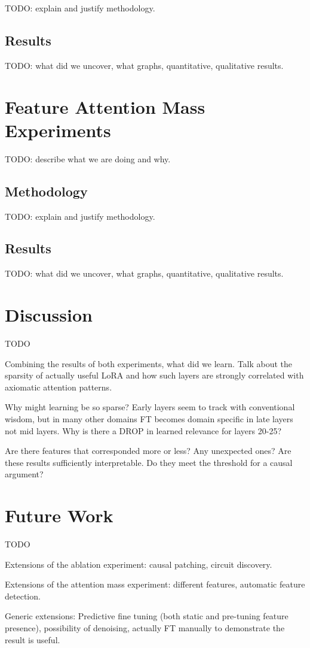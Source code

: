 \documentclass{article}
\begin{document}
TODO: explain and justify methodology.

\subsection*{Results}

TODO: what did we uncover, what graphs, quantitative, qualitative results.

\newpage

\section*{Feature Attention Mass Experiments}

TODO: describe what we are doing and why.

\subsection*{Methodology}

TODO: explain and justify methodology.

\subsection*{Results}

TODO: what did we uncover, what graphs, quantitative, qualitative results.

\newpage

\section*{Discussion}

TODO

Combining the results of both experiments, what did we learn. Talk about the sparsity of actually useful LoRA and how such layers are strongly correlated with axiomatic attention patterns.

Why might learning be so sparse? Early layers seem to track with conventional wisdom, but in many other domains FT becomes domain specific in late layers not mid layers. Why is there a DROP in learned relevance for layers 20-25?

Are there features that corresponded more or less? Any unexpected ones? Are these results sufficiently interpretable. Do they meet the threshold for a causal argument?

\section*{Future Work}

TODO

Extensions of the ablation experiment: causal patching, circuit discovery.

Extensions of the attention mass experiment: different features, automatic feature detection.

Generic extensions: Predictive fine tuning (both static and pre-tuning feature presence), possibility of denoising, actually FT manually to demonstrate the result is useful.
\end{document}
